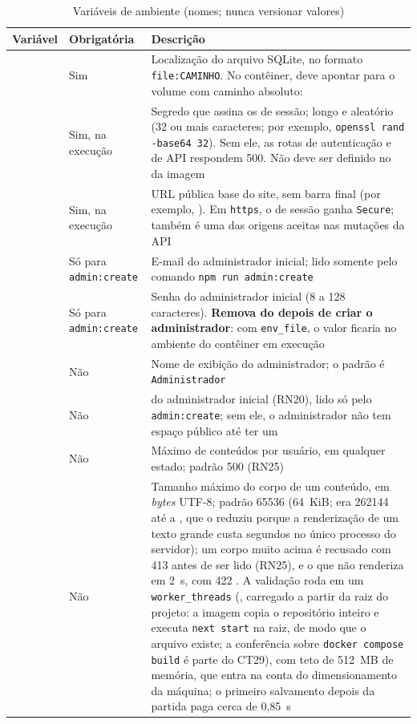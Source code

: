 \begin{table}[htb]
\caption{Variáveis de ambiente (nomes; nunca versionar valores)}\label{tab:env}
\small
\begin{tabularx}{\linewidth}{@{}L{4.1cm}L{2.2cm}Y@{}}
\toprule
\textbf{Variável} & \textbf{Obrigatória} & \textbf{Descrição}\\
\midrule
{} & Sim & Localização do arquivo SQLite, no formato \texttt{file:CAMINHO}. No contêiner, deve apontar para o volume com caminho absoluto: \\
\addlinespace
{} & Sim, na execução & Segredo que assina os  de sessão; longo e aleatório (32 ou mais caracteres; por exemplo, \texttt{openssl rand -base64 32}). Sem ele, as rotas de autenticação e de API respondem 500. Não deve ser definido no  da imagem\\
\addlinespace
{} & Sim, na execução & URL pública base do site, sem barra final (por exemplo, ). Em \texttt{https}, o  de sessão ganha \texttt{Secure}; também é uma das origens aceitas nas mutações da API\\
\addlinespace
{} & Só para \texttt{admin:create} & E-mail do administrador inicial; lido somente pelo comando \texttt{npm run admin:create}\\
\addlinespace
{} & Só para \texttt{admin:create} & Senha do administrador inicial (8 a 128 caracteres). \textbf{Remova do  depois de criar o administrador}: com \texttt{env\_file}, o valor ficaria no ambiente do contêiner em execução\\
\addlinespace
{} & Não & Nome de exibição do administrador; o padrão é \texttt{Administrador}\\
\addlinespace
{} & Não &  do administrador inicial (RN20), lido só pelo \texttt{admin:create}; sem ele, o administrador não tem espaço público até ter um \\
\addlinespace
{} & Não & Máximo de conteúdos por usuário, em qualquer estado; padrão 500 (RN25)\\
\addlinespace
{} & Não & Tamanho máximo do corpo de um conteúdo, em \emph{bytes} UTF-8; padrão 65536 (64~KiB; era 262144 até a , que o reduziu porque a renderização de um texto grande custa segundos no único processo do servidor); um corpo muito acima é recusado com 413 antes de ser lido (RN25), e o que não renderiza em 2~s, com 422 . A validação roda em um \texttt{worker\_threads} (, carregado a partir da raiz do projeto: a imagem copia o repositório inteiro e executa \texttt{next start} na raiz, de modo que o arquivo existe; a conferência sobre \texttt{docker compose build} é parte do CT29), com teto de 512~MB de memória, que entra na conta do dimensionamento da máquina; o primeiro salvamento depois da partida paga cerca de 0,85~s\\

\end{tabularx}
\end{table}
